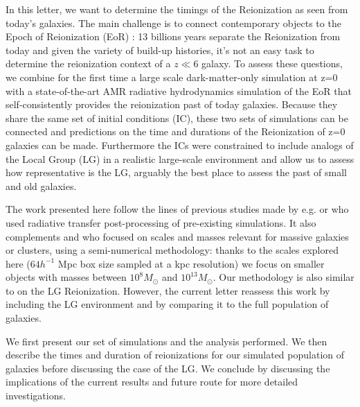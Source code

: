 \documentclass[twocolumn]{aastex61}
\begin{document}
In this letter, we want to determine the timings of the Reionization as seen from today's galaxies. The main challenge is to connect contemporary objects to the Epoch of Reionization (EoR) : 13 billions years separate the Reionization from today and given the variety of build-up histories, it's not an easy task to determine the reionization context of a $z\ll6$ galaxy. To assess these questions, we combine for the first time a large scale dark-matter-only simulation at z=0 with a state-of-the-art AMR radiative hydrodynamics simulation of the EoR that self-consistently provides the reionization past of today galaxies. Because they share the same set of initial conditions (IC), these two sets of simulations can be connected and predictions on the time and durations of the Reionization of z=0 galaxies can be made. Furthermore the ICs were constrained to include analogs of the Local Group (LG) in a realistic large-scale environment and allow us to assess how representative is the LG, arguably the best place to assess the past of small and old galaxies.  



The work presented here follow the lines of previous studies made by e.g. \citet{WEI07} or \citet{DIX17} who used radiative transfer post-processing of pre-existing simulations. It also complements \citet{ALV9} and \citet{LI14} who focused on scales and masses relevant for massive galaxies or clusters, using a semi-numerical methodology: thanks to the scales explored here ($64 h^{-1}$ Mpc box size sampled at a kpc resolution) we focus on smaller objects with masses between $10^8 M_\odot$ and $10^{13} M_\odot$. 
Our methodology is also similar to \citet{OCV14} on the LG Reionization. However, the current letter reassess this work by including the LG environment and by comparing it to the full population of galaxies. 

We first present our set of simulations and the analysis performed. We then describe the times and duration of reionizations for our simulated population of galaxies before discussing the case of the LG. We conclude by discussing the implications of the current results and future route for more detailed investigations.
\end{document}

